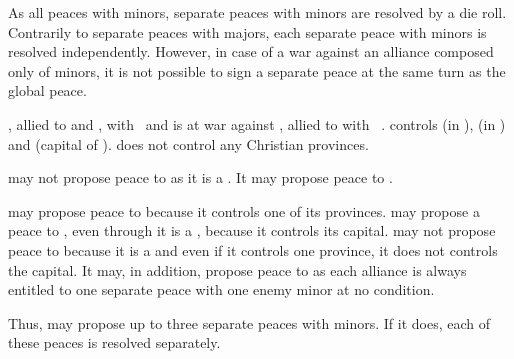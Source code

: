 \bparag As all peaces with minors, separate peaces with minors are resolved by
a die roll.
\bparag Contrarily to separate peaces with majors, each separate peace with
minors is resolved independently.
\bparag However, in case of a war against an alliance composed only of minors,
it is not possible to sign a separate peace at the same turn as the global
peace.

\begin{exemple}
  \TUR, allied to \paysMaroc and \paysTripoli, with \VASSAL\ \paysAlgerie and
  \paysTunisie is at war against \HIS, allied to \paysVenise with \VASSAL\
  \paysChevaliers. \HIS controls \provinceJebelTubqal (in \paysMaroc),
  \provinceOran (in \paysAlgerie) and \provinceIfriqiya (capital of
  \paysTunisie). \TUR does not control any Christian provinces.

  \TUR may not propose peace to \paysChevaliers as it is a \VASSAL. It may
  propose peace to \paysVenise.

  \HIS may propose peace to \paysMaroc because it controls one of its
  provinces. \HIS may propose a peace to \paysTunisie, even through it is a
  \VASSAL, because it controls its capital. \HIS may not propose peace to
  \paysAlgerie because it is a \VASSAL and even if it controls one province,
  it does not controls the capital. It may, in addition, propose peace to
  \paysTripoli as each alliance is always entitled to one separate peace with
  one enemy minor at no condition. 

  Thus, \HIS may propose up to three separate peaces with minors. If it does,
  each of these peaces is resolved separately.
\end{exemple}

